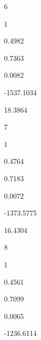 \documentclass[a4paper,portrait,12pt]{article}
\begin{document}
6





1





0.4982





0.7363





0.0082





-1537.1034





18.3864





7





1





0.4764





0.7183





0.0072





-1373.5775





16.4304





8





1





0.4561





0.7099





0.0065





-1236.6114
\end{document}
